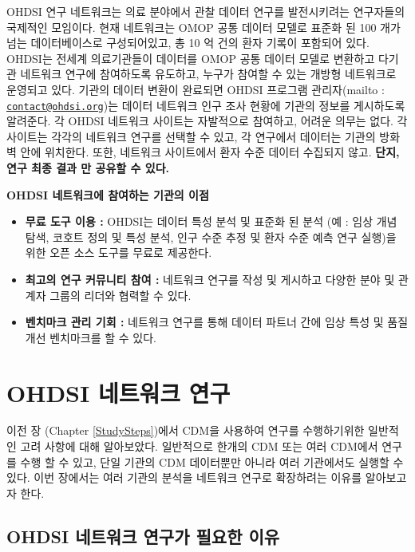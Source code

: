 \documentclass[11pt]{book}
\providecommand{\tightlist}{%
  \setlength{\itemsep}{0pt}\setlength{\parskip}{0pt}}
\theoremstyle{definition}
\theoremstyle{definition}
\theoremstyle{definition}
\theoremstyle{remark}
\let\BeginKnitrBlock\begin \let\EndKnitrBlock\end
\begin{document}
OHDSI 연구 네트워크는 의료 분야에서 관찰 데이터 연구를 발전시키려는
연구자들의 국제적인 모임이다. 현재 네트워크는 OMOP 공통 데이터 모델로
표준화 된 100 개가 넘는 데이터베이스로 구성되어있고, 총 10 억 건의 환자
기록이 포함되어 있다. OHDSI는 전세계 의료기관들이 데이터를 OMOP 공통
데이터 모델로 변환하고 다기관 네트워크 연구에 참여하도록 유도하고,
누구가 참여할 수 있는 개방형 네트워크로 운영되고 있다. 기관의 데이터
변환이 완료되면 OHDSI 프로그램 관리자(mailto :
\href{mailto:contact@ohdsi.org}{\nolinkurl{contact@ohdsi.org}})는 데이터
네트워크 인구 조사 현황에 기관의 정보를 게시하도록 알려준다. 각 OHDSI
네트워크 사이트는 자발적으로 참여하고, 어려운 의무는 없다. 각 사이트는
각각의 네트워크 연구를 선택할 수 있고, 각 연구에서 데이터는 기관의
방화벽 안에 위치한다. 또한, 네트워크 사이트에서 환자 수준 데이터
수집되지 않고. \textbf{단지, 연구 최종 결과 만 공유할 수 있다.}

\BeginKnitrBlock{rmdimportant}
\textbf{OHDSI 네트워크에 참여하는 기관의 이점}

\begin{itemize}
\tightlist
\item
  \textbf{무료 도구 이용 :} OHDSI는 데이터 특성 분석 및 표준화 된 분석
  (예 : 임상 개념 탐색, 코호트 정의 및 특성 분석, 인구 수준 추정 및 환자
  수준 예측 연구 실행)을 위한 오픈 소스 도구를 무료로 제공한다.
\item
  \textbf{최고의 연구 커뮤니티 참여 :} 네트워크 연구를 작성 및 게시하고
  다양한 분야 및 관계자 그룹의 리더와 협력할 수 있다.
\item
  \textbf{벤치마크 관리 기회 :} 네트워크 연구를 통해 데이터 파트너 간에
  임상 특성 및 품질 개선 벤치마크를 할 수 있다.
\end{itemize}
\EndKnitrBlock{rmdimportant}

\section{OHDSI 네트워크 연구}\label{ohdsi--}


이전 장 (Chapter \ref{StudySteps})에서 CDM을 사용하여 연구를
수행하기위한 일반적인 고려 사항에 대해 알아보았다. 일반적으로 한개의 CDM
또는 여러 CDM에서 연구를 수행 할 수 있고, 단일 기관의 CDM 데이터뿐만
아니라 여러 기관에서도 실행할 수 있다. 이번 장에서는 여러 기관의 분석을
네트워크 연구로 확장하려는 이유를 알아보고자 한다.

\subsection{OHDSI 네트워크 연구가 필요한 이유}\label{ohdsi----}
\end{document}
